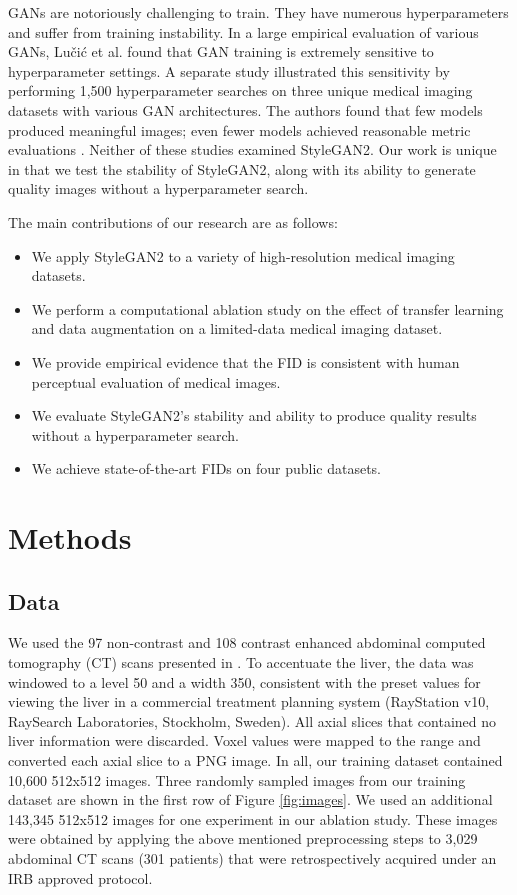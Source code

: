 \documentclass[runningheads]{llncs}
\begin{document}
GANs are notoriously challenging to train.
They have numerous hyperparameters and suffer from training instability.
In a large empirical evaluation of various GANs, Lučić et al. \cite{Lucic2018} found that GAN training is extremely sensitive to hyperparameter settings.
A separate study illustrated this sensitivity by performing 1,500 hyperparameter searches on three unique medical imaging datasets with various GAN architectures.
The authors found that few models produced meaningful images; even fewer models achieved reasonable metric evaluations \cite{skandarani2021}.
Neither of these studies examined StyleGAN2.
Our work is unique in that we test the stability of StyleGAN2, along with its ability to generate quality images without a hyperparameter search.

The main contributions of our research are as follows:
\begin{itemize}
    \item We apply StyleGAN2 to a variety of high-resolution medical imaging datasets.
    \item We perform a computational ablation study on the effect of transfer learning and data augmentation on a limited-data medical imaging dataset.
    \item We provide empirical evidence that the FID is consistent with human perceptual evaluation of medical images.
    \item We evaluate StyleGAN2's stability and ability to produce quality results without a hyperparameter search.
    \item We achieve state-of-the-art FIDs on four public datasets.
\end{itemize}

\section{Methods}

\subsection{Data}

We used the 97 non-contrast and 108 contrast enhanced abdominal computed tomography (CT) scans presented in \cite{Anderson2021}.
To accentuate the liver, the data was windowed to a level 50 and a width 350, consistent with the preset values for viewing the liver in a commercial treatment planning system (RayStation v10, RaySearch Laboratories, Stockholm, Sweden).
All axial slices that contained no liver information were discarded.
Voxel values were mapped to the range  and converted each axial slice to a PNG image.
In all, our training dataset contained 10,600 512x512 images.
Three randomly sampled images from our training dataset are shown in the first row of Figure \ref{fig:images}.
We used an additional 143,345 512x512 images for one experiment in our ablation study.
These images were obtained by applying the above mentioned preprocessing steps to 3,029 abdominal CT scans (301 patients) that were retrospectively acquired under an IRB approved protocol.
\end{document}
